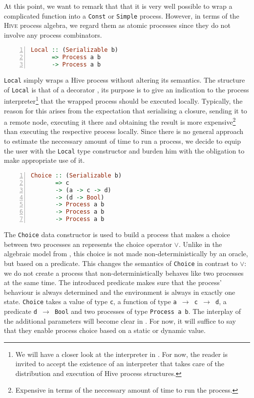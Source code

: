 At this point, we want to remark that that it is very well possible to wrap a complicated function into a \texttt{Const} or \texttt{Simple} process. However, in terms of the \textsc{Hive} process algebra, we regard them as atomic processes since they do not involve any process combinators.

\begin{lstlisting}[language=Haskell,caption=Signature of the \texttt{Local} type constructor.,numbers=left,frame=bt]
Local :: (Serializable b) 
      => Process a b
      -> Process a b
\end{lstlisting}
\texttt{Local} simply wraps a Hive process without altering its semantics. The structure of \texttt{Local} is that of a decorator \cite{Gamma:1995:DPE:186897}, its purpose is to give an indication to the process interpreter\footnote{We will have a closer look at the interpreter in . For now, the reader is invited to accept the existence of an interpreter that takes care of the distribution and execution of Hive process structures.} that the wrapped process should be executed locally. Typically, the reason for this arises from the expectation that serialising a closure, sending it to a remote node, executing it there and obtaining the result is more expensive\footnote{Expensive in terms of the neccessary amount of time to run the process.} than executing the respective process locally. Since there is no general approach to estimate the neccessary amount of time to run a process, we decide to equip the user with the \texttt{Local} type constructor and burden him with the obligation to make appropriate use of it.

\begin{lstlisting}[language=Haskell,caption=Signature of the \texttt{Choice} type constructor.,numbers=left,frame=bt]
Choice :: (Serializable b)
       => c
       -> (a -> c -> d)
       -> (d -> Bool)
       -> Process a b
       -> Process a b
       -> Process a b
\end{lstlisting}
The \texttt{Choice} data constructor is used to build a process that makes a choice between two processes an represents the choice operator $\vee$. Unlike in the algebraic model from , this choice is not made non-deterministically by an oracle, but based on a predicate. This changes the semantics of \texttt{Choice} in contrast to $\vee$: we do not create a process that non-deterministically behaves like two processes at the same time. The introduced predicate makes sure that the process' behaviour is always determined and the environment is always in exactly one state. \texttt{Choice} takes a value of type \texttt{c}, a function of type \texttt{a $\to$ c $\to$ d}, a predicate \texttt{d $\to$ Bool} and two processes of type \texttt{Process a b}. The interplay of the additional parameters will become clear in . For now, it will suffice to say that they enable process choice based on a static or dynamic value.

